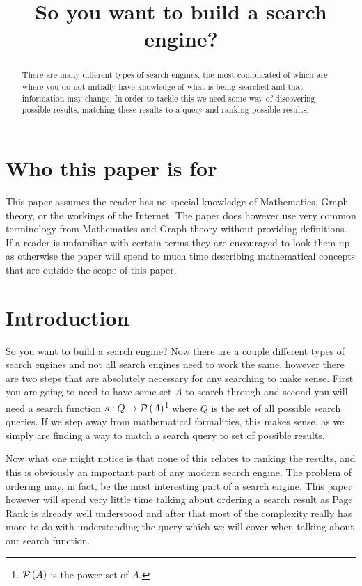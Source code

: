 \documentclass{article}
\title{So you want to build a search engine?}
\begin{document}
	\maketitle
	
	\tableofcontents
	
	\begin{abstract}
		There are many different types of search engines, the most complicated of which are where you do not initially have knowledge of what is being searched and that information may change. In order to tackle this we need some way of discovering possible results, matching these results to a query and ranking possible results. %
	\end{abstract}
	
	\section{Who this paper is for}
	This paper assumes the reader has no special knowledge of Mathematics, Graph theory, or the workings of the Internet. The paper does however use very common terminology from Mathematics and Graph theory without providing definitions. If a reader is unfamiliar with certain terms they are encouraged to look them up as otherwise the paper will spend to much time describing mathematical concepts that are outside the scope of this paper.
	
	\section{Introduction}
	So you want to build a search engine? Now there are a couple different types of search engines and not all search engines need to work the same, however there are two steps that are absolutely necessary for any searching to make sense. First you are going to need to have some set $A$ to search through and second you will need a search function $s:Q\to\mathcal P\left( {A} \right)$\footnote{$\mathcal P\left( {A} \right)$ is the power set of $A$.} where $Q$ is the set of all possible search queries. If we step away from mathematical formalities, this makes sense, as we simply are finding a way to match a search query to set of possible results.
	
	Now what one might notice is that none of this relates to ranking the results, and this is obviously an important part of any modern search engine. The problem of ordering may, in fact, be the most interesting part of a search engine. This paper however will spend very little time talking about ordering a search result as Page Rank is already well understood and after that most of the complexity really has more to do with understanding the query which we will cover when talking about our search function.
	
\end{document}
